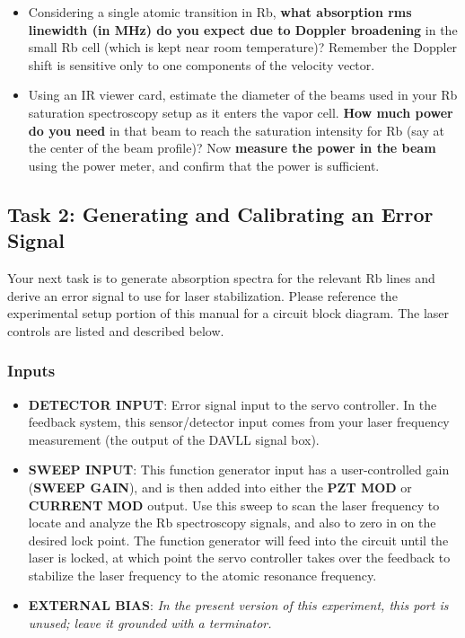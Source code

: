 \documentclass{../lab}
\begin{document}
\begin{itemize}
    \item Considering a single atomic transition in Rb, \textbf{what absorption rms linewidth (in MHz) do you expect due to Doppler broadening} in the small Rb cell (which is kept near room temperature)? Remember the Doppler shift is sensitive only to one components of the velocity vector.

    \item Using an IR viewer card, estimate the diameter of the beams used in your Rb saturation spectroscopy setup as it enters the vapor cell. \textbf{How much power do you need} in that beam to reach the saturation intensity for Rb (say at the center of the beam profile)? Now \textbf{measure the power in the beam} using the power meter, and confirm that the power is sufficient.
\end{itemize}

\subsection{Task 2: Generating and Calibrating an Error Signal}

Your next task is to generate absorption spectra for the relevant Rb lines and derive an error signal to use for laser stabilization. Please reference the experimental setup portion of this manual for a circuit block diagram. The laser controls are listed and described below.

\subsubsection{Inputs}

\begin{itemize}
    \item \textbf{DETECTOR INPUT}: Error signal input to the servo controller. In the feedback system, this sensor/detector input comes from your laser frequency measurement (the output of the DAVLL signal box).

    \item \textbf{SWEEP INPUT}: This function generator input has a user-controlled gain (\textbf{SWEEP GAIN}), and is then added into either the \textbf{PZT MOD} or \textbf{CURRENT MOD} output. Use this sweep to scan the laser frequency to locate and analyze the Rb spectroscopy signals, and also to zero in on the desired lock point. The function generator will feed into the circuit until the laser is locked, at which point the servo controller takes over the feedback to stabilize the laser frequency to the atomic resonance frequency.

    \item \textbf{EXTERNAL BIAS}: %
    \emph{In the present version of this experiment, this port is unused; leave it grounded with a terminator.}
\end{itemize}
\end{document}
